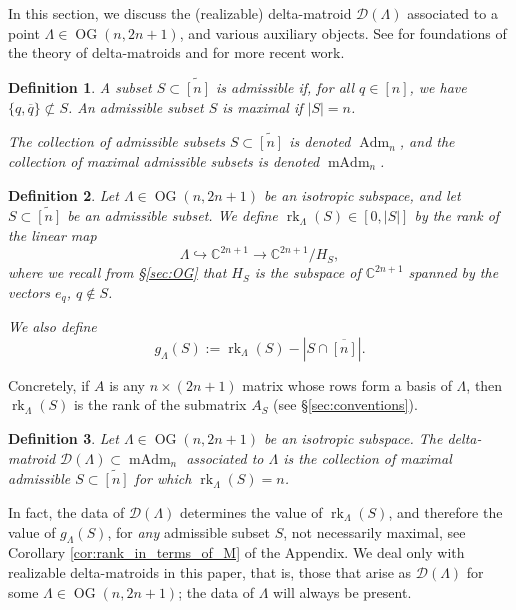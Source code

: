 \documentclass[12pt]{amsart}
\newtheorem{definition}{Definition}[subsection]
\DeclareMathOperator{\Adm}{Adm}
\DeclareMathOperator{\OG}{OG}
\DeclareMathOperator{\rk}{rk}
\DeclareMathOperator{\mAdm}{mAdm}
\newcommand{\bC}{\mathbb{C}}
\newcommand{\cD}{\mathcal{D}}
\newcommand{\wtn}{\widetilde{[n]}}
\newcommand{\barq}{\overline{q}}
\begin{document}
In this section, we discuss the (realizable) delta-matroid $\cD(\Lambda)$ associated to a point $\Lambda\in\OG(n,2n+1)$, and various auxiliary objects. See \cite{dh,bouchet,ck,bgw} for foundations of the theory of delta-matroids and \cite{efls,els,larson} for more recent work.

\begin{definition}\label{def:admissible}
    A subset $S\subset \wtn$ is \emph{admissible} if, for all $q\in[n]$, we have $\{q,\barq\}\not\subset S$. An admissible subset $S$ is \emph{maximal} if $|S|=n$.

    The collection of admissible subsets $S\subset\wtn$ is denoted $\Adm_n$, and the collection of maximal admissible subsets is denoted $\mAdm_n$.
\end{definition}

\begin{definition}\label{def:rank}
Let $\Lambda\in\OG(n,2n+1)$ be an isotropic subspace, and let $S\subset \wtn$ be an admissible subset. We define $\rk_\Lambda(S)\in[0,|S|]$ by the rank of the linear map
\begin{equation*}
\Lambda\hookrightarrow\bC^{2n+1}\to \bC^{2n+1}/H_S,
\end{equation*}
where we recall from \S\ref{sec:OG} that $H_S$ is the subspace of $\bC^{2n+1}$ spanned by the vectors $e_q$, $q\notin S$.

We also define
\begin{equation*}
    g_\Lambda(S):=\rk_\Lambda(S)-|S\cap\overline{[n]}|.
\end{equation*}
\end{definition}

Concretely, if $A$ is any $n\times (2n+1)$ matrix whose rows form a basis of $\Lambda$, then $\rk_\Lambda(S)$ is the rank of the submatrix $A_S$ (see \S\ref{sec:conventions}).

\begin{definition}\label{def:delta_matroid}
    Let $\Lambda\in\OG(n,2n+1)$ be an isotropic subspace. The \emph{delta-matroid} $\cD(\Lambda)\subset\mAdm_n$ associated to $\Lambda$ is the collection of maximal admissible  $S\subset \wtn$ for which $\rk_\Lambda(S)=n$.
\end{definition}

In fact, the data of $\cD(\Lambda)$ determines the value of $\rk_\Lambda(S)$, and therefore the value of $g_\Lambda(S)$, for \emph{any} admissible subset $S$, not necessarily maximal, see Corollary \ref{cor:rank_in_terms_of_M} of the Appendix. We deal only with realizable delta-matroids in this paper, that is, those that arise as $\cD(\Lambda)$ for some $\Lambda\in\OG(n,2n+1)$; the data of $\Lambda$ will always be present.
\end{document}
